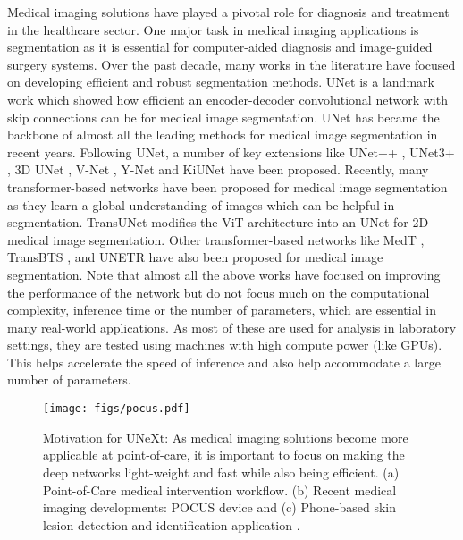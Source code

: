 \documentclass[runningheads]{llncs}
\begin{document}
Medical imaging solutions have played a pivotal role for diagnosis and treatment in the healthcare sector. One major task in medical imaging applications is segmentation as it is essential for computer-aided diagnosis and image-guided surgery systems. Over the past decade, many works in the  literature have focused on developing efficient and robust segmentation methods. UNet \cite{ronneberger2015u} is a landmark work which showed how efficient an encoder-decoder convolutional network with skip connections can be for medical image segmentation. UNet has became the backbone of almost all the leading methods for medical image segmentation in recent years. Following UNet, a number of key extensions like UNet++ \cite{zhou2018unet++}, UNet3+ \cite{huang2020unet}, 3D UNet \cite{cciccek20163d},  V-Net \cite{milletari2016v}, Y-Net \cite{mehta2018net} and KiUNet \cite{valanarasu2020kiu,valanarasu2021kiu} have been proposed.   Recently, many transformer-based networks have  been proposed for medical image segmentation as they learn a global understanding of images which can be helpful in segmentation. TransUNet \cite{chen2021transunet} modifies the ViT architecture \cite{dosovitskiy2020image}  into an UNet for 2D medical image segmentation. Other transformer-based networks like MedT \cite{jose2021medical}, TransBTS \cite{wang2021transbts}, and UNETR \cite{hatamizadeh2022unetr} have also been proposed for medical image segmentation. Note that almost all the above works have focused on improving the performance of the network but do not focus much on the computational complexity, inference time or the number of parameters, which are essential in many real-world applications. As most of these are used for analysis in laboratory settings, they are tested using machines with high compute power (like GPUs). This helps accelerate the speed of inference and also help accommodate a large number of parameters. 

\begin{figure*}[bp]

	\centering
	\texttt{[image: figs/pocus.pdf]}

	\caption{Motivation for UNeXt: As medical imaging solutions become more applicable at point-of-care, it is important to focus on making the deep networks light-weight and fast while also being efficient.  (a) Point-of-Care medical intervention workflow. (b) Recent medical imaging developments: POCUS device \cite{pocus} and (c) Phone-based skin lesion detection and identification application \cite{derm}.}  

	\label{mot}

\end{figure*}
\end{document}
